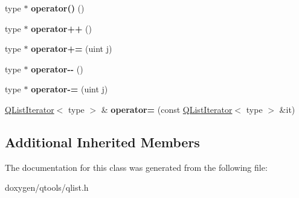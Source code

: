 \begin{DoxyCompactItemize}
\mbox{\label{class_q_list_iterator_a89144a3f0d9c0f4a7eb88a138475dde5}} 
type $\ast$ {\bfseries operator()} ()
\item 
\mbox{\label{class_q_list_iterator_a680b934903a3b9272df2de5800721bfa}} 
type $\ast$ {\bfseries operator++} ()
\item 
\mbox{\label{class_q_list_iterator_a1a07477e5b39b48e6be114008b724095}} 
type $\ast$ {\bfseries operator+=} (uint j)
\item 
\mbox{\label{class_q_list_iterator_a664f92b77623d45e994798b4068131d9}} 
type $\ast$ {\bfseries operator-\/-\/} ()
\item 
\mbox{\label{class_q_list_iterator_af4892f578e82972249fdf3c060b8c173}} 
type $\ast$ {\bfseries operator-\/=} (uint j)
\item 
\mbox{\label{class_q_list_iterator_a82371c1db919ad1ffc2fd089493252f4}} 
\mbox{\hyperlink{class_q_list_iterator}{Q\+List\+Iterator}}$<$ type $>$ \& {\bfseries operator=} (const \mbox{\hyperlink{class_q_list_iterator}{Q\+List\+Iterator}}$<$ type $>$ \&it)
\end{DoxyCompactItemize}
\subsection*{Additional Inherited Members}


The documentation for this class was generated from the following file\+:\begin{DoxyCompactItemize}
\item 
doxygen/qtools/qlist.\+h\end{DoxyCompactItemize}
